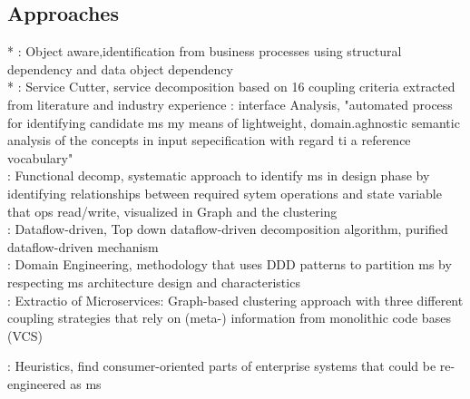 \subsection{Approaches}
* \cite{ObjectAwareAmiri}: Object aware,identification from business processes using structural dependency and data object dependency\\
* \cite{ServiceCutter}: Service Cutter, service decomposition based on 16 coupling criteria extracted from literature and industry experience
\cite{interfaceAnalysisBaresi}: interface Analysis,  "automated process for identifying candidate ms my means of lightweight, domain.aghnostic semantic analysis of the concepts in input sepecification with regard ti a reference vocabulary" \\
\cite{FunctionalDecompositionHeinrich} : Functional decomp, systematic approach to identify ms in design phase by identifying relationships between required sytem operations and state variable that ops read/write, visualized in Graph and the clustering\\
\cite{DataflowDrivenChen}: Dataflow-driven, Top down dataflow-driven decomposition algorithm, purified dataflow-driven mechanism \\
\cite{DomainEngineeringMunezero}: Domain Engineering, methodology that uses DDD patterns to partition ms by respecting ms architecture design and characteristics \\
\cite{ExtractionMazlami}: Extractio of Microservices: Graph-based clustering approach with three different coupling strategies that rely on (meta-) information from monolithic code bases (VCS)

\cite{HeuristicsAlwis}: Heuristics, find consumer-oriented parts of enterprise systems that could be re-engineered as ms



